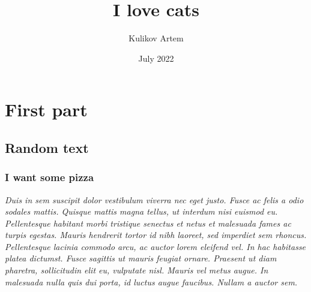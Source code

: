 \documentclass[10pt,a4paper]{report}
\title{I love cats}
\author{Kulikov Artem}
\date{July 2022}
\begin{document}
\maketitle
\tableofcontents
\part{First part}
\chapter{Random text}
\section{I want some pizza}
\textit{Duis in sem suscipit dolor vestibulum viverra nec eget justo. Fusce ac felis a odio sodales mattis. Quisque mattis magna tellus, ut interdum nisi euismod eu. Pellentesque habitant morbi tristique senectus et netus et malesuada fames ac turpis egestas. Mauris hendrerit tortor id nibh laoreet, sed imperdiet sem rhoncus. Pellentesque lacinia commodo arcu, ac auctor lorem eleifend vel. In hac habitasse platea dictumst. Fusce sagittis ut mauris feugiat ornare. Praesent ut diam pharetra, sollicitudin elit eu, vulputate nisl. Mauris vel metus augue. In malesuada nulla quis dui porta, id luctus augue faucibus. Nullam a auctor sem.\cite{guyon2002gene}
}
\end{document}
